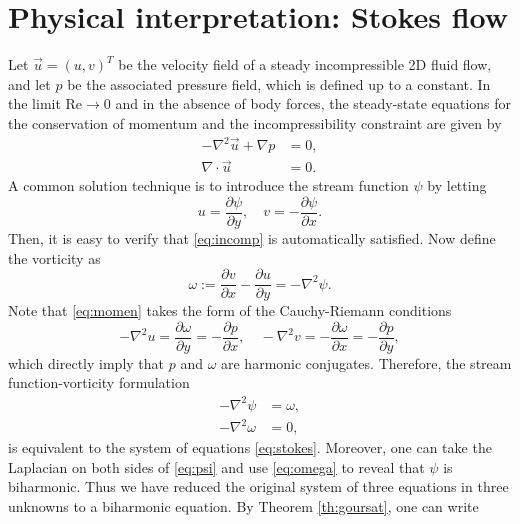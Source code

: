 
\section{Physical interpretation: Stokes flow}

Let $\vec{u}=(u,v)^T$ be the velocity field of a steady incompressible 2D fluid flow, and let $p$ be the associated pressure field, which is defined up to a constant. In the limit $\text{Re}\to 0$ and in the absence of body forces, the steady-state equations for the conservation of momentum and the incompressibility constraint are given by
\begin{subequations}\label{eq:stokes}
\begin{align}
-\nabla^2 \vec{u} + \nabla p &= 0,\label{eq:momen}\\
\nabla\cdot\vec{u} &= 0. \label{eq:incomp}
\end{align}
\end{subequations}
A common solution technique is to introduce the stream function $\psi$ by letting
\begin{equation}
u=\frac{\partial\psi}{\partial y}, \quad 
v=-\frac{\partial\psi}{\partial x}.
\end{equation}
Then, it is easy to verify that \eqref{eq:incomp} is automatically satisfied. Now define the vorticity as
\begin{equation}
\omega := \frac{\partial v}{\partial x} - \frac{\partial u}{\partial y}  = -\nabla^2 \psi.
\end{equation}
Note that \eqref{eq:momen} takes the form of the Cauchy-Riemann conditions 
\begin{equation}\label{eq:pomega}
-\nabla^2u=\frac{\partial\omega}{\partial y} = -\frac{\partial p}{\partial x} , \quad 
-\nabla^2v=-\frac{\partial\omega}{\partial x} = -\frac{\partial p}{\partial y},
\end{equation}
which directly imply that $p$ and $\omega$ are harmonic conjugates. Therefore, the stream function-vorticity formulation
\begin{subequations}
\begin{align}
-\nabla^2\psi &= \omega,\label{eq:psi}\\
-\nabla^2\omega &= 0,\label{eq:omega}
\end{align}
\end{subequations}
is equivalent to the system of equations \eqref{eq:stokes}. Moreover, one can take the Laplacian on both sides of \eqref{eq:psi} and use \eqref{eq:omega} to reveal that $\psi$ is biharmonic. Thus we have reduced the original system of three equations in three unknowns to a biharmonic equation. By Theorem \ref{th:goursat}, one can write
